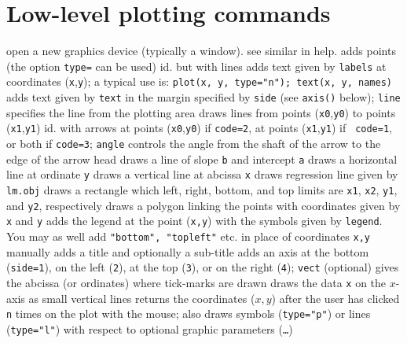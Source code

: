 \section{Low-level plotting commands}{}
	{open a new graphics device (typically a window). see similar in help.}
	{adds points (the option {\tt type=} can be used)}
	{ id. but with lines}
	{ adds text given by {\tt labels} at
coordinates ({\tt x},{\tt y}); a typical use is: {\tt plot(x, y, type="n");
text(x, y, names)}}
	{adds text given by {\tt text} in
the margin specified by {\tt side} (see {\tt axis()} below); {\tt line}
specifies the line from the plotting area}
	{ draws lines from points ({\tt x0},{\tt y0})
to points ({\tt x1},{\tt y1})}
	{id. with arrows at points
({\tt x0},{\tt y0}) if {\tt code=2}, at points ({\tt x1},{\tt y1}) if {\tt
code=1}, or both if {\tt code=3}; {\tt angle} controls the angle from the shaft
of the arrow to the edge of the arrow head}
	{draws a line of slope {\tt b} and intercept {\tt a}}
	{ draws a horizontal line at ordinate {\tt y}}
	{ draws a vertical line at abcissa {\tt x}}
	{ draws regression line given by {\tt lm.obj}}
	{ draws a rectangle which left, right, bottom, and
top limits are {\tt x1}, {\tt x2}, {\tt y1}, and {\tt y2}, respectively}
	{draws a polygon linking the points with coordinates
given by {\tt x} and {\tt y}}
	{ adds the legend at the point ({\tt x,y})
with the symbols given by {\tt legend}. You may as well add {\tt "bottom",
"topleft"} etc. in place of coordinates {\tt x,y} manually}
	{ adds a title and optionally a sub-title}
	{adds an axis at the bottom ({\tt side=1}), on the left
({\tt 2}), at the top ({\tt 3}), or on the right ({\tt 4}); {\tt vect}
(optional) gives the abcissa (or ordinates) where tick-marks are drawn}
	{draws the data {\tt x} on the $x$-axis as small vertical lines}
	{returns the coordinates ($x,y$) after the
user has clicked {\tt n} times on the plot with the mouse; also draws
symbols ({\tt type="p"}) or lines ({\tt type="l"}) with respect to optional
graphic parameters ({\tt \ldots})}

